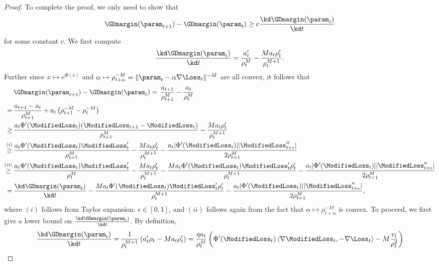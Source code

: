 \begin{proof}
To complete the proof, we only need to show that
\begin{equation*}
    \GDmargin (\param_{t+1}) - \GDmargin (\param_t) \ge c \frac{\kd \GDmargin(\param_t)}{\kd t}
\end{equation*}
for some constant $c$. We first compute
\begin{equation*}
    \frac{\kd \GDmargin(\param_t)}{\kd t} = \frac{a_t^{\prime}}{\rho_t^M} - \frac{M a_t \rho_t'}{\rho_t^{M+1}}.
\end{equation*}
Further since $x \mapsto e^{\Phi (x)}$ and $\alpha \mapsto \rho_{t + \alpha}^{-M} = \| \param_{t} - \alpha \nabla \Loss_t \|^{-M}$ are all convex, it follows that
\begin{align*}
    & \GDmargin (\param_{t+1}) - \GDmargin (\param_t) = \, \frac{a_{t+1}}{\rho_{t+1}^M} - \frac{a_t}{\rho_t^M} \\
    = \, & \frac{a_{t+1} - a_t}{\rho_{t+1}^M} + a_t \left( \rho_{t+1}^{-M} - \rho_t^{-M} \right) \\
    \ge \, & \frac{a_t \Phi'(\ModifiedLoss_t) (\ModifiedLoss_{t+1} - \ModifiedLoss_t)}{\rho_{t+1}^M} - \frac{M a_t \rho_t'}{\rho_t^{M+1}} \\
    \stackrel{(i)}{\ge} \, & \frac{a_t \Phi'(\ModifiedLoss_t) \ModifiedLoss_t'}{\rho_{t+1}^M} - \frac{M a_t \rho_t'}{\rho_t^{M+1}} - \frac{a_t \vert \Phi'(\ModifiedLoss_t) \vert \vert \ModifiedLoss_{t + \epsilon}'' \vert }{2 \rho_{t+1}^M} \\
    \stackrel{(ii)}{\ge} \, & \frac{a_t \Phi'(\ModifiedLoss_t) \ModifiedLoss_t'}{\rho_t^M} - \frac{M a_t \rho_t'}{\rho_t^{M+1}} - \frac{M a_t \Phi'(\ModifiedLoss_t) \ModifiedLoss_t' \rho_t'}{\rho_t^{M+1}} - \frac{a_t \vert \Phi'(\ModifiedLoss_t) \vert \vert \ModifiedLoss_{t + \epsilon}'' \vert }{2 \rho_{t+1}^M} \\
    = \, & \frac{\kd \GDmargin(\param_t)}{\kd t} - \frac{M a_t \Phi'(\ModifiedLoss_t) \ModifiedLoss_t' \rho_t'}{\rho_t^{M+1}} - \frac{a_t \vert \Phi'(\ModifiedLoss_t) \vert \vert \ModifiedLoss_{t + \epsilon}'' \vert }{2 \rho_{t+1}^M},
\end{align*}
where $(i)$ follows from Taylor expansion: $\epsilon \in [0, 1]$, and $(ii)$ follows again from the fact that $\alpha \mapsto \rho_{t + \alpha}^{-M}$ is convex. To proceed, we first give a lower bound on $\frac{\kd \GDmargin(\param_t)}{\kd t}$. By definition,
\begin{align*}
    \frac{\kd \GDmargin(\param_t)}{\kd t} = \, & \frac{1}{\rho_t^{M+1}} \left( a_t^\prime \rho_t - M a_t \rho_t' \right) = \frac{\eta a_t}{\rho_t^{M}} \left( \Phi'(\ModifiedLoss_t) \left\langle \nabla \ModifiedLoss_t, - \nabla \Loss_t \right\rangle - M  \frac{v_t}{\rho_t^2} \right) \\

\end{align*}
\end{proof}
